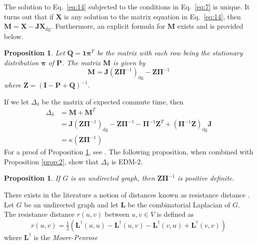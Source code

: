 \documentclass[10pt,twocolumn]{article}
\newtheorem{proposition}[theorem]{Proposition}
\numberwithin{equation}{section}
\begin{document}
The solution to Eq.~\eqref{eq:14} subjected to the conditions in
Eq.~\eqref{eq:7} is unique. It turns out that if $\mathbf{X}$ is any
solution to the matrix equation in Eq.~\eqref{eq:14}, then $\mathbf{M}
= \mathbf{X} - \mathbf{J}\mathbf{X}_{\mathrm{dg}}$. Furthermore, an
explicit formula for $\mathbf{M}$ exists and is provided below. 
\begin{proposition}
  \label{prop:3}
  Let $\mathbf{Q} = \mathbf{1}\bm{\pi}^{T}$ be the matrix with each
  row being the stationary distribution $\bm{\pi}$ of
  $\mathbf{P}$. The matrix $\mathbf{M}$ is given by
  \begin{equation}
    \label{eq:8}
    \mathbf{M} = \mathbf{J}(\mathbf{Z} \bm{\Pi}^{-1})_{\mathrm{dg}} - \mathbf{Z}
    \bm{\Pi}^{-1}
  \end{equation}
  where $\mathbf{Z} = (\mathbf{I} - \mathbf{P} + \mathbf{Q})^{-1}$. 
\end{proposition}
If we let $\Delta_{\delta}$ be the matrix of expected commute time,
then
\begin{equation*}
  \begin{split}
    \Delta_\delta &= \mathbf{M} + \mathbf{M}^{T} \\ &= 
    \mathbf{J}(\mathbf{Z}\bm{\Pi}^{-1})_{\mathrm{dg}} - \mathbf{Z}\bm{\Pi}^{-1} -
    \bm{\Pi}^{-1}\mathbf{Z}^{T} +
    (\bm{\Pi}^{-1}\mathbf{Z})_{\mathrm{dg}}\mathbf{J} \\
    &= \kappa(\mathbf{Z}\bm{\Pi}^{-1})
  \end{split}
\end{equation*}
For a proof of Proposition \ref{prop:3}, see
\cite{kemeny83:_finit_markov_chain}.  The
following proposition, when combined with Proposition \ref{prop:2},
show that $\Delta_{\delta}$ is EDM-2.
\begin{proposition}
  \label{prop:4}
  If $G$ is an undirected graph, then $\mathbf{Z}\bm{\Pi}^{-1}$ is 
  positive definite.
\end{proposition}
There exists in the literature a notion of distances known as
resistance distance
\cite{bapat99:_resis_distan_in_graph,klein93:_resis_distan}. Let $G$
be an undirected graph and let $\mathbf{L}$ be the combinatorial
Laplacian of $G$. The resistance distance $r(u,v)$ between $u, v \in
V$ is defined as
\begin{equation*}
  r(u,v) = \tfrac{1}{2}(\mathbf{L}^{\dagger}(u,u) - \mathbf{L}^{\dagger}(u,v) -
  \mathbf{L}^{\dagger}(v,u) + \mathbf{L}^{\dagger}(v,v))
\end{equation*}
where $\mathbf{L}^{\dagger}$ is the {\em Moore-Penrose}
\end{document}
